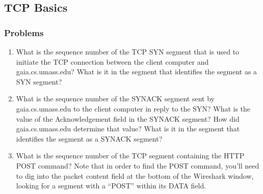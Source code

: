 \subsection{TCP Basics}
    \subsubsection*{Problems}
    \begin{enumerate}[label=\bfseries Problem \arabic*:,leftmargin=*,labelindent=1em]
    \addtocounter{enumi}{2}
        \item What is the sequence number of the TCP SYN segment that is used to initiate the TCP connection between the client computer and gaia.cs.umass.edu? What is it in the segment that identifies the segment as a SYN segment?\\[0.2mm]
        \soln
        \item What is the sequence number of the SYNACK segment sent by gaia.cs.umass.edu to the client computer in reply to the SYN? What is the value of the Acknowledgement field in the SYNACK segment? How did gaia.cs.umass.edu determine that value? What is it in the segment that identifies the segment as a SYNACK segment?\\[0.2mm]
        \soln
        \item What is the sequence number of the TCP segment containing the HTTP POST command? Note that in order to find the POST command, you’ll need to dig into the packet content field at the bottom of the Wireshark window, looking for a segment with a “POST” within its DATA field.\\[0.2mm]

\end{enumerate}
